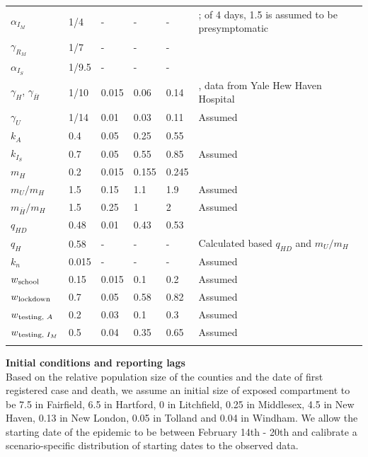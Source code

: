 \documentclass[11pt]{article}
\begin{document}
\begin{spacing}{.9}
\begin{longtable}[H] {p{} p{} p{} p{} p{} p{} }
		$\alpha_{I_M}$ & 1/4 & {-} & {-} & {-} & \citep{salje2020estimating, li2020substantial, kissler2020projecting}; of 4 days, 1.5 is assumed to be presymptomatic \citep{wei2020presymptomatic} \\[0.5em]
		$\gamma_{R_M}$ & 1/7 & {-} & {-} & {-} & \citep{wolfel2020virological, cdc2020isolation} \\[0.5em]
		$\alpha_{I_S}$ & 1/9.5 & {-} & {-} & {-} & \citep{verity2020estimates, lewnard2020incidence} \\[0.5em]
		$\gamma_H$, $\gamma_{\bar{H}}$ & 1/10 & 0.015 & 0.06 & 0.14 & \citep{lewnard2020incidence, paranjpe2020clinical}, data from Yale Hew Haven Hospital \\[0.5em]
		$\gamma_U$ & 1/14 & 0.01 & 0.03 & 0.11 & Assumed \\[0.5em]
		$k_A$ & 0.4 & 0.05 & 0.25 & 0.55 & \citep{salomon2020defining, ferguson2020impact} \\[0.5em]
		$k_{I_S}$ &  0.7 & 0.05 & 0.55 & 0.85 & Assumed \\[0.5em]
		$m_H$ & 0.2 & 0.015 & 0.155 & 0.245 & \citep{lewnard2020incidence, paranjpe2020clinical, petrilli2020factors, verity2020estimates, CHAwebsite} \\[0.5em]
		$m_U / m_H$ & 1.5 & 0.15 & 1.1 & 1.9 & Assumed \\[0.5em]
		$m_{\bar{H}} / m_H$ & 1.5 & 0.25 & 1 & 2 & Assumed \\[0.5em]
		$q_{HD}$ & 0.48 & 0.01 & 0.43 & 0.53 & \citep{CHAwebsite, DPHwebsite} \\[0.5em]		
		$q_H$ & 0.58 & {-} & {-} & {-} & {Calculated based $q_{HD}$ and $m_U/m_H$} \\[0.5em]
		$k_n$ & 0.015 & {-} & {-} & {-} & Assumed \\[0.5em]
		$w\textsubscript{school}$ & 0.15 & 0.015 & 0.1 & 0.2 & Assumed \\[0.5em]
		$w\textsubscript{lockdown}$ & 0.7 & 0.05 & 0.58 & 0.82 & Assumed \\[0.5em]
		$w\textsubscript{testing, $A$}$ & 0.2 & 0.03 & 0.1 & 0.3 & Assumed \\[0.5em]
		$w\textsubscript{testing, $I_M$}$ & 0.5 & 0.04 & 0.35 & 0.65 & Assumed \\[0.5em]
		\hline
	\label{table:priors}
	\end{longtable}
\end{spacing}


\textbf{Initial conditions and reporting lags}\\[0.5em]
Based on the relative population size of the counties and the date of first registered case and death, we assume an initial size of exposed compartment to be 7.5 in Fairfield, 6.5 in Hartford, 0 in Litchfield, 0.25 in Middlesex, 4.5 in New Haven, 0.13 in New London, 0.05 in Tolland and 0.04 in Windham. We allow the starting date of the epidemic to be between February 14th - 20th and calibrate a scenario-specific distribution of starting dates to the observed data. 
\end{document}
